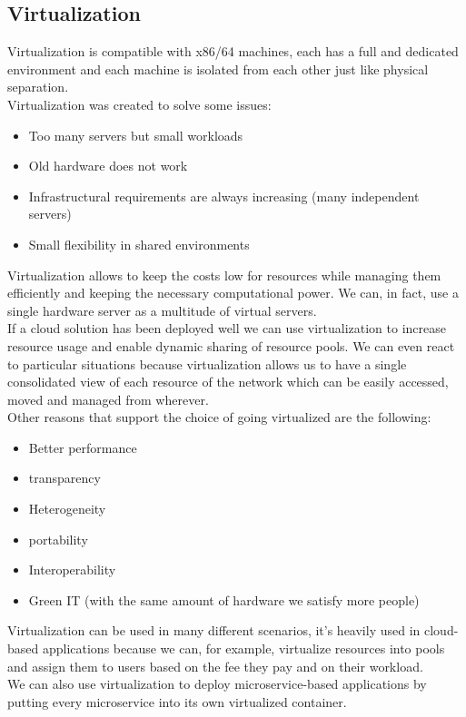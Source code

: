 \subsection{Virtualization}
Virtualization is compatible with x86/64 machines, each has a full and dedicated environment and each machine is isolated from each other just like physical separation. \\
Virtualization was created to solve some issues:
\begin{itemize}
    \item Too many servers but small workloads
    \item Old hardware does not work
    \item Infrastructural requirements are always increasing (many independent servers)
    \item Small flexibility in shared environments
\end{itemize}
Virtualization allows to keep the costs low for resources while managing them efficiently and keeping the necessary computational power. We can, in fact, use a single hardware server as a multitude of virtual servers. \\
If a cloud solution has been deployed well we can use virtualization to increase resource usage and enable dynamic sharing of resource pools. We can even react to particular situations because virtualization allows us to have a single consolidated view of each resource of the network which can be easily accessed, moved and managed from wherever. \\
Other reasons that support the choice of going virtualized are the following:
\begin{itemize}
    \item Better performance
    \item transparency
    \item Heterogeneity
    \item portability
    \item Interoperability
    \item Green IT (with the same amount of hardware we satisfy more people)
\end{itemize}
Virtualization can be used in many different scenarios, it's heavily used in cloud-based applications because we can, for example, virtualize resources into pools and assign them to users based on the fee they pay and on their workload. \\
We can also use virtualization to deploy microservice-based applications by putting every microservice into its own virtualized container. \\
